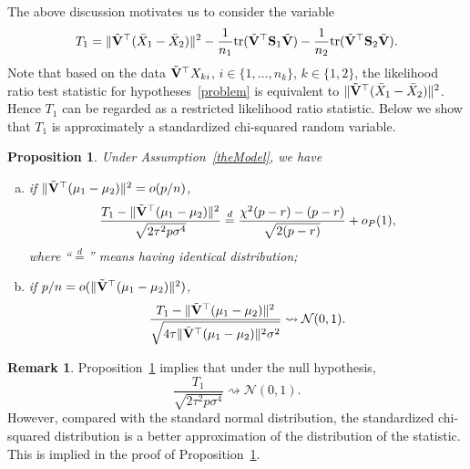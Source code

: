 \documentclass[times,sort&compress,3p]{elsarticle}
\newcommand{\mytr}{ {\rm tr} }
\theoremstyle{plain}
\newtheorem{proposition}{\quad\quad Proposition}
\theoremstyle{definition}
\newtheorem{remark}{\quad\quad Remark}
\theoremstyle{remark}
\begin{document}
The above discussion motivates us to consider the variable
\begin{equation*}
\begin{aligned}
    T_1=\|\tilde{\BV}^\top (\bar{X}_1-\bar{X}_2)\|^2-\frac{1}{n_1}\mytr(\tilde{\BV}^\top  \BS_1\tilde{\BV})-\frac{1}{n_2}\mytr(\tilde{\BV}^\top  \BS_2\tilde{\BV}).
    \\
\end{aligned}
\end{equation*}
Note that based on the data $\tilde{\mathbf{V}}^\top  X_{ki}$, $i\in \{1,\ldots,n_k \}$, $k\in \{1,2\}$, the likelihood ratio test statistic for hypotheses~\eqref{problem} is equivalent to 
    $\|\tilde{\mathbf{V}}^\top  (\bar{X}_1-\bar{X}_2)\|^2$. 
Hence $T_1$ can be regarded as a restricted likelihood ratio statistic.
Below we show that $T_1$ is approximately a standardized chi-squared random variable.
\begin{proposition}\label{oracleTheorem}
    Under Assumption~\ref{theModel}, we have 
    \begin{enumerate}[(a)]
\item
    if $\|\tilde{\mathbf{V}}^\top (\mu_1-\mu_2)\|^2= o(p/n)$,
    \begin{equation}\label{oracleTheoremR1}
        \frac{T_1-\|\tilde{\BV}^\top (\mu_1-\mu_2)\|^2}
        {\sqrt{2\tau^2 p\sigma^4}}%
        \overset{d}{=} \frac{\chi^2(p-r)-(p-r)}{\sqrt{2(p-r)}}+o_P(1),
    \end{equation}
where ``$\overset{d}{=}$'' means having identical distribution;
\item
    if $p/n= o(\|\tilde{\mathbf{V}}^\top (\mu_1-\mu_2)\|^2)$, 
    \begin{equation}\label{oracleTheoremR2}
        \frac{T_1-\|\tilde{\mathbf{V}}^\top (\mu_1-\mu_2)\|^2}
        {\sqrt{4\tau\|\tilde{\mathbf{V}}^\top (\mu_1-\mu_2)\|^2\sigma^2}}\rightsquigarrow \mathcal{N}(0,1).
    \end{equation}
    \end{enumerate}
\end{proposition}
\begin{remark}
    Proposition~\ref{oracleTheorem} implies that under the null hypothesis,
    $$
        \frac{T_1}
        {\sqrt{2\tau^2 p\sigma^4}}\rightsquigarrow \mathcal{N}(0,1).
    $$
    However, compared with the standard normal distribution, the standardized chi-squared distribution is a better approximation of the distribution of the statistic.
    This is implied in the proof of Proposition~\ref{oracleTheorem}.
\end{remark}
\end{document}
